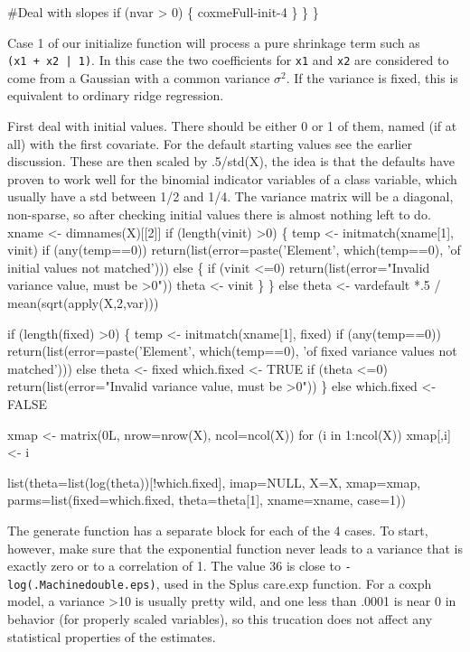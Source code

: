 \documentclass{article}
\begin{document}
        #Deal with slopes
        if (nvar > 0) \{
            \LA{}coxmeFull-init-4\RA{}
            \}
        \}
    \}
\nwendcode{}\nwdocspar

Case 1 of our initialize function will process a pure
shrinkage term such as {\tt{}(x1\ +\ x2\ |\ 1)}.
In this case the two coefficients for {\tt{}x1} and {\tt{}x2} are considered
to come from a Gaussian with a common variance $\sigma^2$.
If the variance is fixed, this is equivalent to ordinary ridge
regression.

First deal with initial values.  There should be either 0 or 1 of
them, named (if at all) with the first covariate. 
For the default starting values see the earlier discussion. 
These are then scaled by .5/std(X), the idea is that the defaults have proven
to work well for the binomial indicator variables of a class variable, 
which usually have a std between 1/2 and 1/4.
The variance matrix will be a diagonal, non-sparse, so after checking
initial values there is almost nothing left to do.
\nwenddocs{}\endmoddef
xname <- dimnames(X)[[2]]
if (length(vinit) >0) \{
  temp <- initmatch(xname[1], vinit)
  if (any(temp==0)) 
      return(list(error=paste('Element', which(temp==0),
                              'of initial values not matched')))
  else \{
      if (vinit <=0) return(list(error="Invalid variance value, must be >0")) 
      theta <- vinit
      \}
  \}
else theta <- vardefault *.5 / mean(sqrt(apply(X,2,var)))
  
if (length(fixed) >0) \{
    temp <- initmatch(xname[1], fixed)
    if (any(temp==0))
        return(list(error=paste('Element', which(temp==0),
                                'of fixed variance values not matched')))
    else theta <- fixed
    which.fixed <- TRUE
    if (theta <=0) return(list(error="Invalid variance value, must be >0"))
    \}
else which.fixed <- FALSE

xmap <- matrix(0L, nrow=nrow(X), ncol=ncol(X))
for (i in 1:ncol(X)) xmap[,i] <- i

list(theta=list(log(theta))[!which.fixed], imap=NULL, X=X, xmap=xmap,
         parms=list(fixed=which.fixed, theta=theta[1],
                    xname=xname, case=1))
\nwendcode{}\nwdocspar

The generate function has a separate block for each of the 4 cases.
To start, however, make sure that the exponential function never leads
to a variance that is exactly zero or to a correlation of 1.  The value
36 is close to {\tt{}-log(.Machine{}double.eps)}, used in the Splus care.exp
function.  For a coxph model, a variance >10 is usually pretty wild, and
one less than .0001 is near 0 in behavior (for properly scaled variables),
so this trucation does not affect any statistical properties of the estimates.
\end{document}

